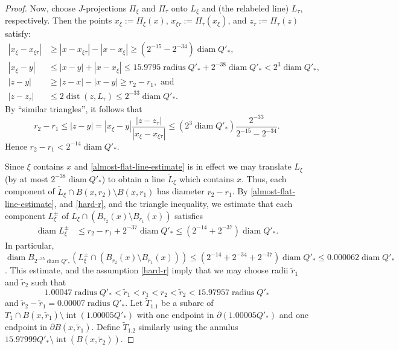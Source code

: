 \documentclass[12pt]{amsart}
\numberwithin{equation}{section}
\theoremstyle{plain}
\theoremstyle{definition}
\newcommand{\radius}{\mathop\mathrm{radius}\nolimits}
\newcommand{\diam}{\mathop\mathrm{diam}\nolimits}
\newcommand{\dist}{\mathop\mathrm{dist}\nolimits}
\newcommand{\interior}{\mathop\mathrm{int}\nolimits}
\numberwithin{figure}{section}
\begin{document}
\begin{proof}
Now, choose $J$-projections $\Pi_\xi$ and $\Pi_\tau$ onto $L_\xi$ and (the relabeled line) $L_\tau$, respectively. Then the points $x_\xi:=\Pi_\xi(x)$,  $x_{\xi\tau}:=\Pi_\tau(x_\xi)$, and $z_{\tau}:=\Pi_\tau(z)$ satisfy: \begin{align}
|x_\xi-x_{\xi\tau}| &\geq |x-x_{\xi\tau}|-|x-x_\xi|\geq (2^{-15} - 2^{-34})\diam Q'_*,\\
|x_\xi-y| &\leq |x-y|+|x-x_\xi|\leq 15.9795\radius Q'_*+2^{-38}\diam Q'_*< 2^3\diam Q'_*,\\
|z-y|&\geq |z-x|-|x-y|\geq r_2-r_1,\text{ and}\\
|z-z_{\tau}| &\leq 2\dist(z,L_\tau)\leq 2^{-33}\diam Q'_*.\end{align} By ``similar triangles'', it follows that  \begin{equation} r_2-r_1\leq |z-y|=|x_\xi-y|\frac{|z-z_{\tau}|}{|x_\xi-x_{\xi\tau}|}\leq (2^{3}\diam Q'_*)\frac{2^{-33}}{2^{-15} - 2^{-34}}.\end{equation} Hence $r_2-r_1 < 2^{-14}\diam Q'_*$.

Since $\xi$ contains $x$ and \eqref{almost-flat-line-estimate} is in effect we may translate $L_\xi$ (by at most $2^{-38}\diam Q'_*$) to obtain a line $\tilde L_{\xi}$ which contains $x$. Thus, each component of $\tilde L_{\xi} \cap B(x, r_2) \setminus B(x, r_1)$ has diameter $r_2-r_1$. By \eqref{almost-flat-line-estimate}, and \eqref{hard-r}, and the triangle inequality, we estimate that each component $L_{\xi}^{\pm}$ of $L_{\xi} \cap (B_{r_2}(x)\setminus B_{r_1}(x))$ satisfies
\begin{align*}
    \diam L^{\pm}_{\xi} & \le r_2 - r_1 + 2^{-37}\diam Q'_* \le (2^{-14} + 2^{-37}) \diam Q'_*.
\end{align*}
In particular, $\diam B_{2^{-35}\diam Q'_*}(L_{\xi}^{\pm} \cap (B_{r_2}(x)\setminus B_{r_1}(x))) \le (2^{-14} +2^{-34} + 2^{-37}) \diam Q'_* \le 0.000062\diam Q'_*$.
This estimate, and the assumption \eqref{hard-r} imply that we may choose radii $\tilde r_1$ and $\tilde r_2$ such that $$1.00047\radius Q'_*<\tilde r_1<r_1<r_2<\tilde r_2<15.97957\radius Q'_*$$ and $\tilde r_2-\tilde r_1=0.00007\radius Q'_*$. Let $\tilde T_{1.1}$ be a subarc of $T_1\cap B(x,\tilde r_1)\setminus \interior(1.00005Q'_*)$ with one endpoint in $\partial(1.00005Q'_*)$ and one endpoint in $\partial B(x,\tilde r_1)$. Define $\tilde T_{1.2}$ similarly using the annulus $15.97999Q'_*\setminus\interior(B(x,\tilde r_2))$.


\end{proof}
\end{document}

